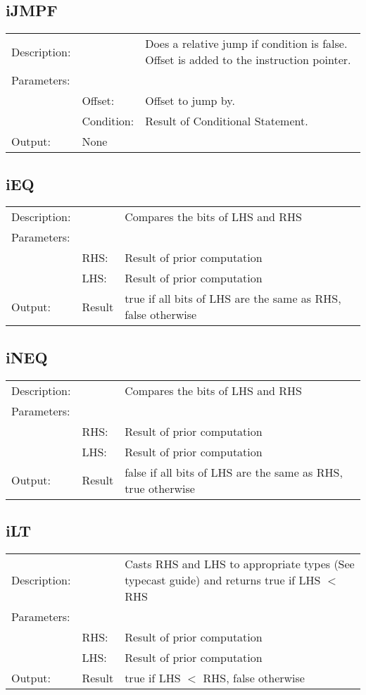 \documentclass{standalone}
\begin{document}
\subsection{iJMPF}
\begin{tabular}{l l p{10cm}}
Description: & ~    & Does a relative jump if condition is false. Offset is added to the instruction pointer.\\
Parameters:  & ~ & ~ \\
~			 & Offset: & Offset to jump by.\\
~			 & Condition: & Result of Conditional Statement.\\
Output:      & None & ~ \\
\end{tabular}

\subsection{iEQ}
\begin{tabular}{l l p{10cm}}
Description: & ~    & Compares the bits of LHS and RHS\\
Parameters:  & ~ & ~ \\
~			 & RHS: & Result of prior computation\\
~			 & LHS: & Result of prior computation\\
Output:      & Result & true if all bits of LHS are the same as RHS, false otherwise                        \\
\end{tabular}

\subsection{iNEQ}
\begin{tabular}{l l p{10cm}}
Description: & ~    & Compares the bits of LHS and RHS\\
Parameters:  & ~ & ~\\
~			 & RHS: & Result of prior computation\\
~			 & LHS: & Result of prior computation\\
Output:      & Result & false if all bits of LHS are the same as RHS, true otherwise\\
\end{tabular}

\subsection{iLT}
\begin{tabular}{l l p{10cm}}
Description: & ~    & Casts RHS and LHS to appropriate types (See typecast guide) and returns true if LHS $<$ RHS\\
Parameters:  & ~ & ~ \\
~			 & RHS: & Result of prior computation\\
~			 & LHS: & Result of prior computation\\
Output:      & Result & true if LHS $<$ RHS, false otherwise\\
\end{tabular}
\end{document}
